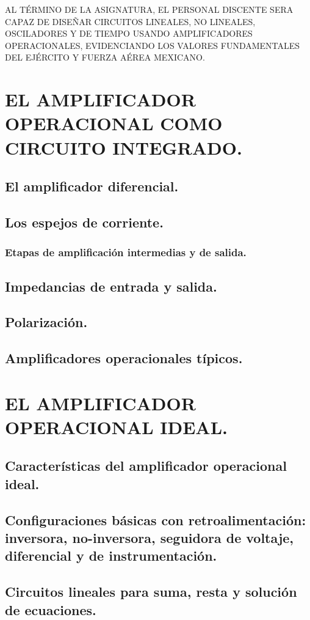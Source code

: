 \documentclass{myarticle}
\begin{document}
\noindent
AL TÉRMINO DE LA ASIGNATURA, EL PERSONAL DISCENTE SERA CAPAZ DE DISEÑAR CIRCUITOS LINEALES, NO LINEALES, OS\-CI\-LA\-DO\-RES Y DE TIEMPO USANDO AMPLIFICADORES OPERACIONALES, EVIDENCIANDO LOS VALORES FUNDAMENTALES DEL EJÉRCITO Y FUERZA AÉREA MEXICANO.
\tableofcontents
\section{ EL AMPLIFICADOR OPERACIONAL COMO CIRCUITO INTEGRADO.}
\subsection{El amplificador diferencial.}
\subsection{Los espejos de corriente.}
\subsubsection{Etapas de amplificación intermedias y de salida.}
\subsection{Impedancias de entrada y salida.}
\subsection{Polarización.}
\subsection{Amplificadores operacionales típicos.}
\section{ EL AMPLIFICADOR OPERACIONAL IDEAL.}
\subsection{Características del amplificador operacional ideal.}
\subsection{Configuraciones básicas con retroalimentación: inversora, no-inversora, seguidora de voltaje, diferencial y de instrumentación.}
\subsection{Circuitos lineales para suma, resta y solución de ecuaciones.}
\end{document}
